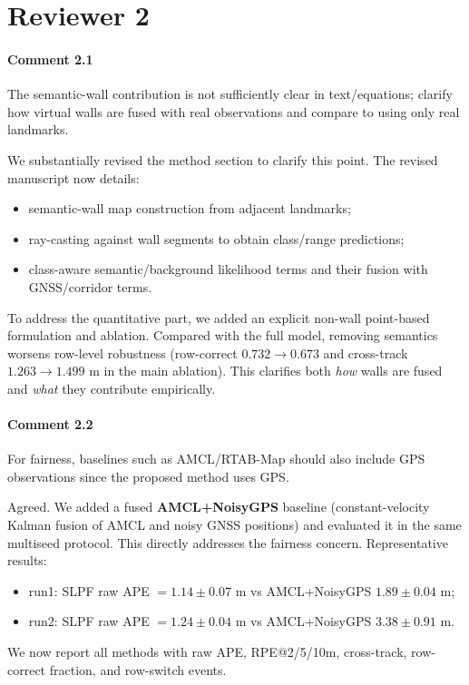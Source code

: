 \documentclass[a4paper]{article}
\def\answer#1#2{\begin{tcolorbox}[width=\textwidth,colback={white},title={\textbf{Answer
 #1}},colbacktitle=answerBoxColor,coltitle=white] #2 \end{tcolorbox} }
\begin{document}
\newpage
\section*{Reviewer 2}

\paragraph{Comment 2.1}
{\color{commentColor}
The semantic-wall contribution is not sufficiently clear in text/equations; clarify how virtual walls are fused with real observations and compare to using only real landmarks.
}
\answer{2.1}{
We substantially revised the method section to clarify this point.
The revised manuscript now details:
\begin{itemize}
  \item semantic-wall map construction from adjacent landmarks;
  \item ray-casting against wall segments to obtain class/range predictions;
  \item class-aware semantic/background likelihood terms and their fusion with GNSS/corridor terms.
\end{itemize}
To address the quantitative part, we added an explicit non-wall point-based formulation and ablation.
Compared with the full model, removing semantics worsens row-level robustness (row-correct $0.732\rightarrow0.673$ and cross-track $1.263\rightarrow1.499$ m in the main ablation).
This clarifies both \emph{how} walls are fused and \emph{what} they contribute empirically.
}

\paragraph{Comment 2.2}
{\color{commentColor}
For fairness, baselines such as AMCL/RTAB-Map should also include GPS observations since the proposed method uses GPS.
}
\answer{2.2}{
Agreed. We added a fused \textbf{AMCL+NoisyGPS} baseline (constant-velocity Kalman fusion of AMCL and noisy GNSS positions) and evaluated it in the same multiseed protocol.
This directly addresses the fairness concern.
Representative results:
\begin{itemize}
  \item run1: SLPF raw APE $=1.14\pm0.07$ m vs AMCL+NoisyGPS $1.89\pm0.04$ m;
  \item run2: SLPF raw APE $=1.24\pm0.04$ m vs AMCL+NoisyGPS $3.38\pm0.91$ m.
\end{itemize}
We now report all methods with raw APE, RPE@2/5/10m, cross-track, row-correct fraction, and row-switch events.
}
\end{document}
